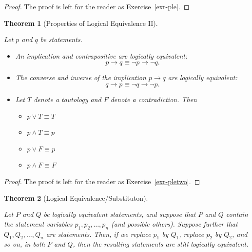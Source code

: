 \documentclass[
  letterpaper,
  10pt,
  reqno,
  twopage,
  openany]{book}
\providecommand{\tightlist}{%
  \setlength{\itemsep}{0pt}\setlength{\parskip}{0pt}}\usepackage{longtable,booktabs,array}
\theoremstyle{plain}
\theoremstyle{definition}
\theoremstyle{definition}
\theoremstyle{definition}
\theoremstyle{plain}
\theoremstyle{plain}
\newtheorem{theorem}{Theorem}[chapter]
\theoremstyle{remark}
\begin{document}
\begin{proof}

The proof is left for the reader as Exercise~\ref{exr-ple}.

\end{proof}

\leavevmode{}%
\begin{theorem}[Properties of Logical Equivalence II]\label{thm-pletwo}

Let \(p\) and \(q\) be statements.

\begin{itemize}
\tightlist
\item
  An implication and contrapositive are logically equivalent: \[
  p\rightarrow q \equiv \neg p \rightarrow \neg q. \]
\item
  The converse and inverse of the implication \(p\rightarrow q\) are
  logically equivalent:
  \[q\rightarrow p \equiv \neg q \rightarrow \neg p.\]
\item
  Let \(T\) denote a tautology and \(F\) denote a contradiction. Then

  \begin{itemize}
  \tightlist
  \item
    \(p\lor T \equiv T\)
  \item
    \(p\land T \equiv p\)
  \item
    \(p\lor F\equiv p\)
  \item
    \(p\land F \equiv F\)\\
  \end{itemize}
\end{itemize}

\end{theorem}

\begin{proof}

The proof is left for the reader as Exercise~\ref{exr-pletwo}.

\end{proof}

\leavevmode{}%
\begin{theorem}[Logical
Equivalence/Substituton]\label{thm-logicequivsub}

Let \(P\) and \(Q\) be logically equivalent statements, and suppose that
\(P\) and \(Q\) contain the statement variables
\(p_1, p_2, \ldots, p_n\) (and possible others). Suppose further that
\(Q_1, Q_2, \ldots, Q_n\) are statements. Then, if we replace \(p_1\) by
\(Q_1\), replace \(p_2\) by \(Q_2\), and so on, in both \(P\) and \(Q\),
then the resulting statements are still logically equivalent.

\end{theorem}
\end{document}
